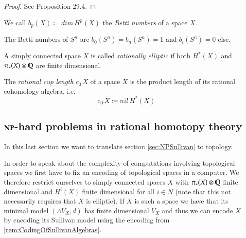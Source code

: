 \begin{proof}
 See \cite{Felix2001} Proposition 29.4. %
\end{proof}

\begin{Definition}
 We call $b_p (X) \coloneqq dim \, H^p(X)$ the \emph{Betti numbers} of a space $X$.
\end{Definition}

\begin{Example}
 The Betti numbers of $S^n$ are $b_0(S^n) = b_n(S^n) = 1$ and $ b_i(S^n) = 0$ else.
\end{Example}

\begin{Definition}
 A simply connected space $X$ is called \emph{rationally elliptic} if both $H^*(X)$ and $\pi_*(X) \otimes \mathbb{Q}$ are finite dimensional.
\end{Definition}


\begin{Definition}
 The \emph{rational cup length} $c_0 \,X$ of a space $X$ is the product length of its rational cohomology algebra,
 i.e. 
 $$ c_0 \, X \coloneqq nil \, H^*(X) $$
\end{Definition}



\subsection{$\mathbf{NP}$-hard problems in rational homotopy theory}

In this last section we want to translate section \ref{sec:NPSullivan} to topology.

\begin{Remark}
 In order to speak about the complexity of computations involving topological spaces we first have to
 fix an encoding of topological spaces in a computer. We therefore restrict ourselves to simply connected
 spaces $X$ with $\pi_*(X) \otimes \mathbb{Q}$ finite dimensional and $H^i(X)$ finite dimensional for all $i \in N$
 (note that this not necessarily requires that $X$ is elliptic). If $X$ is such a space we have that
 its minimal model $(\Lambda V_X, d)$ has finite dimensional $V_X$ and thus
 we can encode $X$ by encoding its Sullivan model using the encoding from 
 \ref{rem:CodingOfSullivanAlgebras}. 
\end{Remark}

